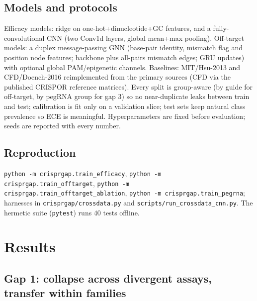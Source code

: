 \documentclass[12pt]{article}
\begin{document}
\subsection{Models and protocols}
Efficacy models: ridge on one-hot+dinucleotide+GC features, and a
fully-convolutional CNN (two Conv1d layers, global mean+max pooling).
Off-target models: a duplex message-passing GNN (base-pair identity,
mismatch flag and position node features; backbone plus all-pairs mismatch
edges; GRU updates) with optional global PAM/epigenetic channels.
Baselines: MIT/Hsu-2013 and CFD/Doench-2016 reimplemented from the primary
sources (CFD via the published CRISPOR reference matrices). Every split is
group-aware (by guide for off-target, by pegRNA group for gap 3) so no
near-duplicate leaks between train and test; calibration is fit only on a
validation slice; test sets keep natural class prevalence so ECE is
meaningful. Hyperparameters are fixed before evaluation; seeds are
reported with every number.
\subsection{Reproduction}
\texttt{python -m crisprgap.train\_efficacy},
\texttt{python -m crisprgap.train\_offtarget},
\texttt{python -m crisprgap.train\_offtarget\_ablation},
\texttt{python -m crisprgap.train\_pegrna}; harnesses in
\texttt{crisprgap/crossdata.py} and \texttt{scripts/run\_crossdata\_cnn.py}.
The hermetic suite (\texttt{pytest}) runs 40 tests offline.



\section{Results}
\subsection{Gap 1: collapse across divergent assays, transfer within families}
\end{document}

